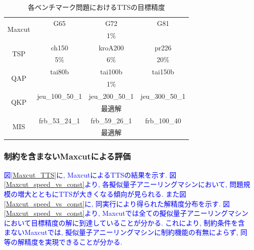 \documentclass[submit,techrep,noauthor]{ipsj}
\begin{document}
\begin{table}[th]
\centering
  \caption{各ベンチマーク問題におけるTTSの目標精度}
    \begin{tabular}{|c||c|c|c|}
      \hline
      \multirow{2}{*}{Maxcut} & G65 & G72 & G81\\
      \cline{2-2} \cline{3-3} \cline{4-4}
                            & \multicolumn{3}{|c|}{1\%}\\ \hline
      \multirow{2}{*}{TSP} & ch150 & kroA200 & pr226\\
      \cline{2-2} \cline{3-3} \cline{4-4}
                              & 5\% & 6\% & 20\%\\ \hline
      \multirow{2}{*}{QAP} & tai80b & tai100b & tai150b\\
      \cline{2-2} \cline{3-3} \cline{4-4}
                            & \multicolumn{3}{|c|}{1\%}\\ \hline
      \multirow{2}{*}{QKP} & jeu\_100\_50\_1 & jeu\_200\_50\_1 & jeu\_300\_50\_1\\
      \cline{2-2} \cline{3-3} \cline{4-4}
                            & \multicolumn{3}{|c|}{最適解}\\ \hline
      \multirow{2}{*}{MIS} & frb\_53\_24\_1 & frb\_59\_26\_1 & frb\_100\_40\\
      \cline{2-2} \cline{3-3} \cline{4-4}
                            & \multicolumn{3}{|c|}{最適解}\\ \hline
    \end{tabular}
\label{table_target2}
\end{table}

\subsubsection{制約を含まないMaxcutによる評価}
\textcolor{blue}{図\ref{Maxcut_TTS}に, MaxcutによるTTSの結果を示す. 図\ref{Maxcut_speed_vs_const}より, 各擬似量子アニーリングマシンにおいて, 問題規模の増大とともにTTSが大きくなる傾向が見られる. また図\ref{Maxcut_speed_vs_const}に, 同実行により得られた解精度分布を示す. 図\ref{Maxcut_speed_vs_const}より, Maxcutでは全ての擬似量子アニーリングマシンにおいて目標精度の解に到達していることが分かる. これにより, 制約条件を含まないMaxcutでは, 擬似量子アニーリングマシンに制約機能の有無によらず, 同等の解精度を実現できることが分かる.}
\end{document}
